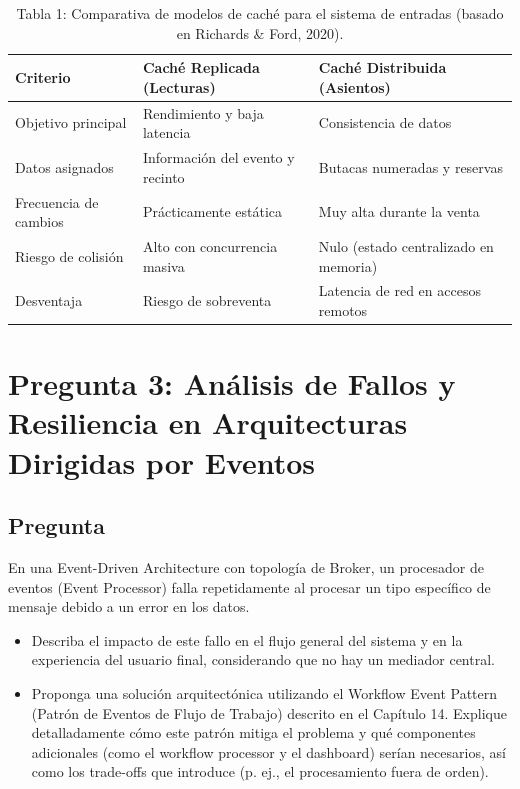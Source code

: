 \documentclass[12pt, a4paper]{article}
\begin{document}
    \begin{table}[H]
    \centering
    \begin{tabular}{|l|p{4.5cm}|p{4.5cm}|}
                \toprule
        Criterio & Caché Replicada (Lecturas) & Caché Distribuida (Asientos) \\
                \midrule
        Objetivo principal & Rendimiento y baja latencia & Consistencia de datos \\
        Datos asignados & Información del evento y recinto & Butacas numeradas y reservas \\
        Frecuencia de cambios & Prácticamente estática & Muy alta durante la venta \\
        Riesgo de colisión & Alto con concurrencia masiva & Nulo (estado centralizado en memoria) \\
        Desventaja & Riesgo de sobreventa & Latencia de red en accesos remotos \\
                \bottomrule
    \end{tabular}
    \caption*{Tabla 1: Comparativa de modelos de caché para el sistema de entradas (basado en Richards \& Ford, 2020).}
    \end{table}

    \section[Análisis de Fallos y Resiliencia en Arquitecturas Dirigidas por Eventos]{Pregunta 3: Análisis de Fallos y Resiliencia en Arquitecturas Dirigidas por Eventos}
    \subsection{Pregunta}
    En una Event-Driven Architecture con topología de Broker, un procesador de eventos (Event Processor) falla repetidamente al procesar un tipo específico de mensaje debido a un error en los datos.

    \begin{itemize}
        \item Describa el impacto de este fallo en el flujo general del sistema y en la experiencia del usuario final, considerando que no hay un mediador central.
        \item Proponga una solución arquitectónica utilizando el Workflow Event Pattern (Patrón de Eventos de Flujo de Trabajo) descrito en el Capítulo 14. Explique detalladamente cómo este patrón mitiga el problema y qué componentes adicionales (como el workflow processor y el dashboard) serían necesarios, así como los trade-offs que introduce (p. ej., el procesamiento fuera de orden).
    \end{itemize}
\end{document}
